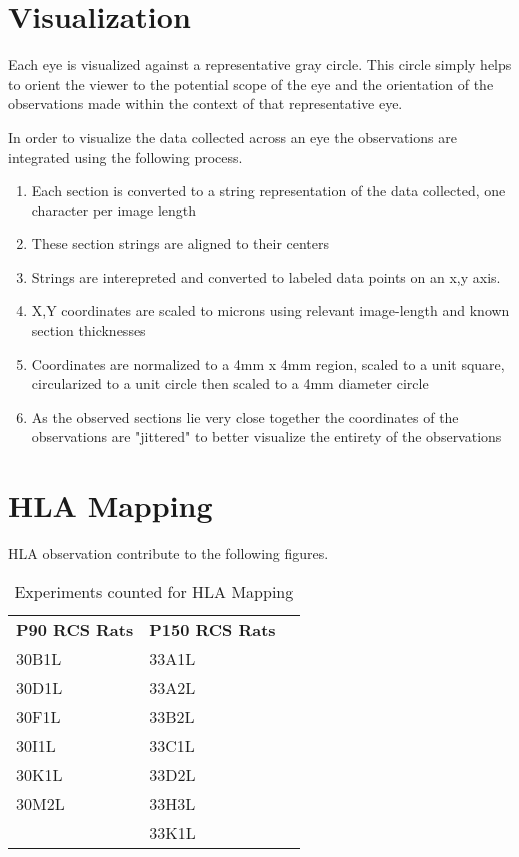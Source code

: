 \documentclass{article}
\begin{document}
\section{Visualization}
Each eye is visualized against a representative gray circle. This circle simply helps to orient the viewer to the potential scope of the eye and the orientation of the observations made within the context of that representative eye.

In order to visualize the data collected across an eye the observations are integrated using the following process. 

\begin{enumerate}
\item Each section is converted to a string representation of the data collected, one character per image length
\item These section strings are aligned to their centers
\item Strings are interepreted and converted to labeled data points on an x,y axis. 
\item X,Y coordinates are scaled to microns using relevant image-length and known section thicknesses
\item Coordinates are normalized to a 4mm x 4mm region, scaled to a unit square, circularized to a unit circle then scaled to a 4mm diameter circle
\item As the observed sections lie very close together the coordinates of the observations are "jittered" to better visualize the entirety of the observations
\end{enumerate}

\clearpage
\section{HLA Mapping}
HLA observation contribute to the following figures. 
\begin{table}[]
\centering
\begin{tabular}{lll}
 \textbf{P90 RCS Rats} & \textbf{P150 RCS Rats} \\
30B1L & 33A1L \\
30D1L & 33A2L \\
30F1L & 33B2L \\
30I1L & 33C1L \\
30K1L & 33D2L \\
30M2L & 33H3L \\
 & 33K1L \\
\end{tabular}
\caption{Experiments counted for HLA Mapping}
\end{table}
\end{document}
